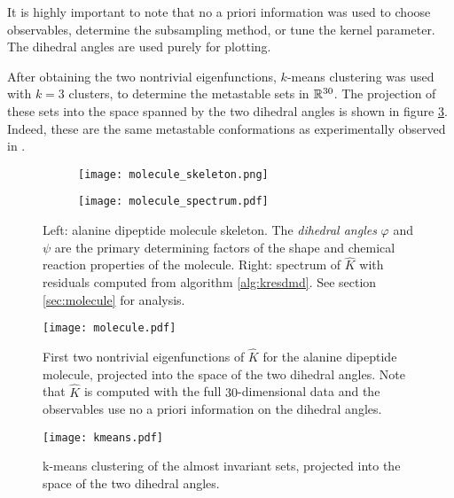 It is highly important to note that no a priori information was used to choose 
observables, determine the subsampling method, or tune the kernel parameter. The dihedral 
angles are used purely for plotting. 

After obtaining the two nontrivial eigenfunctions, $k$-means clustering was used with 
$k = 3$ clusters, to determine the metastable sets in $\mathbb{R}^{30}$. The projection of these 
sets into the space spanned by the two dihedral angles is shown in figure 
\ref{fig:molecule_kmeans}. Indeed, these are the same metastable conformations as 
experimentally observed in \cite{molecule}. 

\begin{figure}
    \centering
    \begin{subfigure}{0.45\textwidth}
        \centering
        \texttt{[image: molecule\_skeleton.png]}
    \end{subfigure}
    \hfill
    \begin{subfigure}{0.45\textwidth}
        \centering
        \texttt{[image: molecule\_spectrum.pdf]}
    \end{subfigure}
    \caption{
        Left: alanine dipeptide molecule skeleton. The \emph{dihedral angles} $\varphi$ 
        and $\psi$ are the primary determining factors of the shape and chemical reaction 
        properties of the molecule. 
        Right: spectrum of $\widehat{ K }$ with residuals computed from algorithm 
        \ref{alg:kresdmd}. See section \ref{sec:molecule} for analysis. 
    }\label{fig:molecule_skeleton_spectrum}
\end{figure}

\begin{figure}
    \centering
    \texttt{[image: molecule.pdf]}
    \caption{
        First two nontrivial eigenfunctions of $\widehat{ K }$ for the alanine dipeptide 
        molecule, projected into the space of the two dihedral angles. Note that 
        $\widehat{ K }$ is computed with the full $30$-dimensional data and the 
        observables use no a priori information on the dihedral angles. 
    }\label{fig:molecule_eigenfunctions}
\end{figure}

\begin{figure}
    \centering
    \texttt{[image: kmeans.pdf]}
    \caption{
        k-means clustering of the almost invariant sets, projected into the space of the 
        two dihedral angles. 
    }\label{fig:molecule_kmeans}
\end{figure}

